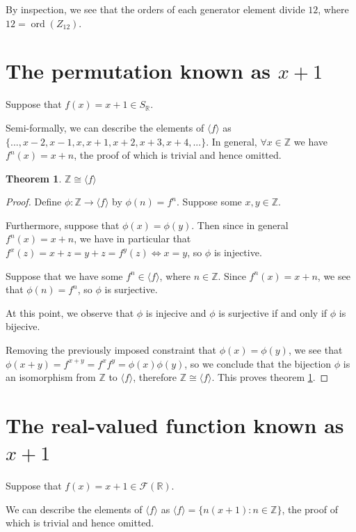 \documentclass[12pt]{article}
\newcommand{\reals}{\mathbb{R}}
\newcommand{\ints}{\mathbb{Z}}
\newcommand{\ord}{\operatorname{ord}}
\newcommand{\freals}{\mathcal{F}(\reals)}
\newtheorem{thm}{Theorem}
\begin{document}
By inspection, we see that the orders of each generator element divide $12$,
where $12 = \ord(Z_{12})$.

\section{The permutation known as $x + 1$}

Suppose that $f(x) = x + 1 \in S_\reals$.

Semi-formally, we can describe the elements of $\langle f \rangle$
as $\{ ..., x - 2, x - 1, x, x + 1, x + 2, x + 3, x + 4, ... \}$.
In general, $\forall x \in \ints$ we have $f^n(x) = x + n$,
the proof of which is trivial and hence omitted.

\begin{thm} \label{thm7}
	$\ints \cong \langle f \rangle$
\end{thm}

\begin{proof}
	Define $\phi: \ints \to \langle f \rangle$
	by $\phi(n) = f^n$.
	Suppose some $x,y \in \ints$.
	
	Furthermore, suppose that $\phi(x) = \phi(y)$.
	Then since in general $f^n(x) = x + n$,
	we have in particular that $f^x(z) = x + z = y + z = f^y(z) \iff x = y$,
	so $\phi$ is injective.

	Suppose that we have some $f^n \in \langle f \rangle$,
	where $n \in \ints$.
	Since $f^n(x) = x + n$,
	we see that $\phi(n) = f^n$,
	so $\phi$ is surjective.

	At this point,
	we observe that
	$\phi$ is injecive
	and $\phi$ is surjective
	if and only if
	$\phi$ is bijecive.

	Removing the previously imposed constraint
	that $\phi(x) = \phi(y)$,
	we see that $\phi(x + y) = f^{x + y} = f^xf^y = \phi(x)\phi(y)$,
	so we conclude that the bijection $\phi$
	is an isomorphism from $\ints$ to $\langle f \rangle$,
	therefore $\ints \cong \langle f \rangle$.
	This proves theorem \ref{thm7}.
\end{proof}

\section{The real-valued function known as $x + 1$}

Suppose that $f(x) = x + 1 \in \freals$.

We can describe the elements of $\langle f \rangle$
as $\langle f \rangle = \{ n(x + 1):n \in \ints \}$,
the proof of which is trivial and hence omitted.
\end{document}
